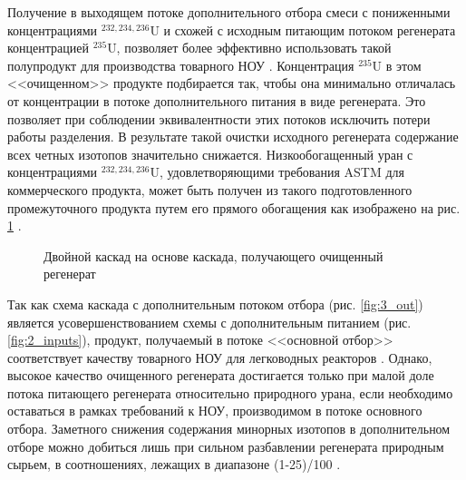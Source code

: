 Получение в выходящем потоке дополнительного отбора смеси с пониженными концентрациями $^{232,234,236}$U и схожей с исходным питающим потоком регенерата концентрацией $^{235}$U, позволяет более эффективно использовать такой полупродукт для производства товарного НОУ \cite{palkinSeparationUraniumIsotopes2010}. Концентрация $^{235}$U в этом <<очищенном>> продукте подбирается так, чтобы она минимально отличалась от концентрации в потоке дополнительного питания в виде регенерата. Это позволяет при соблюдении эквивалентности этих потоков исключить потери работы разделения. В результате такой очистки исходного регенерата содержание всех четных изотопов значительно снижается. Низкообогащенный уран с концентрациями $^{232,234,236}$U, удовлетворяющими требования ASTM для коммерческого продукта, может быть получен из такого подготовленного промежуточного продукта путем его прямого обогащения как изображено на рис. \ref{fig:int_double} \cite{shopenSposobPolucheniyaRazbavitelya2008}.

\begin{figure}[ht]
  \caption{Двойной каскад на основе каскада, получающего очищенный регенерат}\label{fig:int_double}
\end{figure}

Так как схема каскада с дополнительным потоком отбора (рис. \ref{fig:3_out}) является усовершенствованием схемы с дополнительным питанием (рис. \ref{fig:2_inputs}), продукт, получаемый в потоке <<основной отбор>> соответствует качеству товарного НОУ для легководных реакторов \cite{palkinSeparationUraniumIsotopes2010}. Однако, высокое качество очищенного регенерата достигается только при малой доле потока питающего регенерата относительно природного урана, если необходимо оставаться в рамках требований к НОУ, производимом в потоке основного отбора. Заметного снижения содержания минорных изотопов в дополнительном отборе можно добиться лишь при сильном разбавлении регенерата природным сырьем, в соотношениях, лежащих в диапазоне (1-25)/100 \cite{palkinSeparationUraniumIsotopes2010, smirnovKaskadnyeShemyZadachah2012}. 

